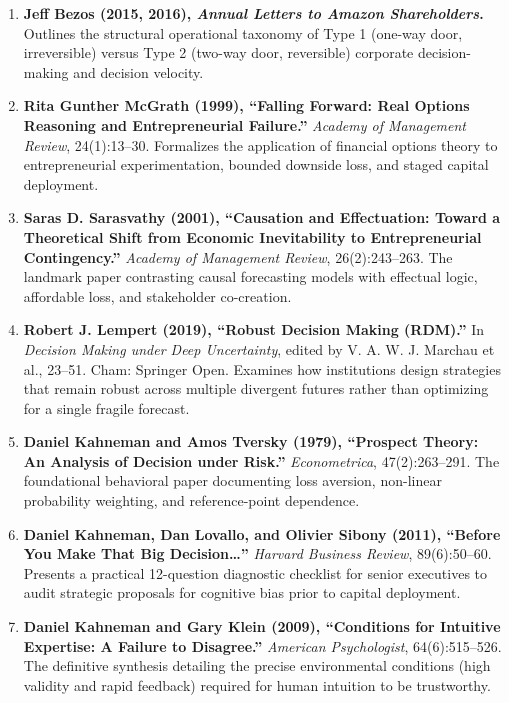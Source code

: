 \begin{enumerate}[leftmargin=14pt,itemsep=3pt,topsep=2pt,parsep=0pt]
  \item \textbf{Jeff Bezos (2015, 2016), \textit{Annual Letters to Amazon Shareholders}.} Outlines the structural operational taxonomy of Type 1 (one-way door, irreversible) versus Type 2 (two-way door, reversible) corporate decision-making and decision velocity.

  \item \textbf{Rita Gunther McGrath (1999), ``Falling Forward: Real Options Reasoning and Entrepreneurial Failure.''} \textit{Academy of Management Review}, 24(1):13--30. Formalizes the application of financial options theory to entrepreneurial experimentation, bounded downside loss, and staged capital deployment.

  \item \textbf{Saras D. Sarasvathy (2001), ``Causation and Effectuation: Toward a Theoretical Shift from Economic Inevitability to Entrepreneurial Contingency.''} \textit{Academy of Management Review}, 26(2):243--263. The landmark paper contrasting causal forecasting models with effectual logic, affordable loss, and stakeholder co-creation.

  \item \textbf{Robert J. Lempert (2019), ``Robust Decision Making (RDM).''} In \textit{Decision Making under Deep Uncertainty}, edited by V. A. W. J. Marchau et al., 23--51. Cham: Springer Open. Examines how institutions design strategies that remain robust across multiple divergent futures rather than optimizing for a single fragile forecast.

  \item \textbf{Daniel Kahneman and Amos Tversky (1979), ``Prospect Theory: An Analysis of Decision under Risk.''} \textit{Econometrica}, 47(2):263--291. The foundational behavioral paper documenting loss aversion, non-linear probability weighting, and reference-point dependence.

  \item \textbf{Daniel Kahneman, Dan Lovallo, and Olivier Sibony (2011), ``Before You Make That Big Decision\dots''} \textit{Harvard Business Review}, 89(6):50--60. Presents a practical 12-question diagnostic checklist for senior executives to audit strategic proposals for cognitive bias prior to capital deployment.

  \item \textbf{Daniel Kahneman and Gary Klein (2009), ``Conditions for Intuitive Expertise: A Failure to Disagree.''} \textit{American Psychologist}, 64(6):515--526. The definitive synthesis detailing the precise environmental conditions (high validity and rapid feedback) required for human intuition to be trustworthy.


\end{enumerate}
